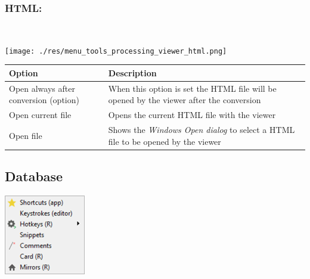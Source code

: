 \hypertarget{menu_tools_processing_viewer_html}{}
\subsubsection{HTML:}\\

\texttt{[image: ./res/menu\_tools\_processing\_viewer\_html.png]}\\

\begin{scriptsize}
  \begin{tabularx}{\textwidth}{>{\hsize=0.7\hsize}X>{\hsize=0.7\hsize}X}\\
    \hline
    \textbf{Option} & \textbf{Description} \\
    \hline
    Open always after conversion (option) & When this option is set the HTML file will be opened
     by the viewer after the conversion \\
    \hdashline[1pt/1pt]
    Open current file & Opens the current HTML file with the viewer \\
    Open file & Shows the \textit{Windows Open dialog} to select a HTML file to be opened by the viewer \\
    \hline
  \end{tabularx}
\end{scriptsize}


\hypertarget{menu_tools_database}{}
\subsection{Database}

\includegraphics[scale=0.50]{./res/menu_tools_database.png}\\

